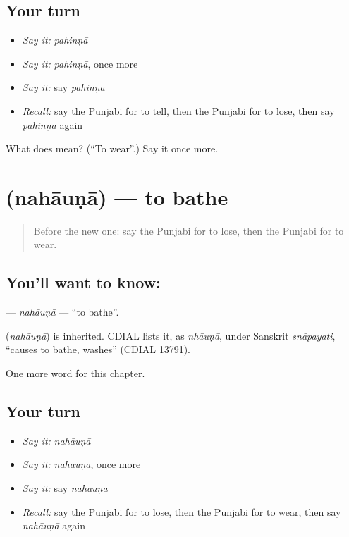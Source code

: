 \subsection*{Your turn}
\begin{itemize}
\raggedright
  \item \emph{Say it:} \emph{pahinṇā}
  \item \emph{Say it:} \emph{pahinṇā}, once more
  \item \emph{Say it:} say \emph{pahinṇā}
  \item \emph{Recall:} say the Punjabi for to tell, then the Punjabi for to lose, then say \emph{pahinṇā} again
\end{itemize}

\begin{tcolorbox}[breakable,colback=teal!4,colframe=teal!35!black,title={Before you move on}]
What does  mean? (\textquotedblleft{}To wear\textquotedblright{}.) Say it once more.
\end{tcolorbox}
\section[\texorpdfstring{\pa{ਨਹਾਉਣਾ} (nahāuṇā)}{ਨਹਾਉਣਾ (nahāuṇā)}]{ (nahāuṇā) — to bathe}

\label{lesson:PA-C62-nahauna}



\begin{quote}
Before the new one: say the Punjabi for to lose, then the Punjabi for to wear.
\end{quote}

\subsection*{You'll want to know: }
\textbf{} — \emph{nahāuṇā} — \textquotedblleft{}to bathe\textquotedblright{}.

\begin{cousinweb}
\textbf{} (\emph{nahāuṇā}) is inherited. CDIAL lists it, as \emph{nhāuṇā}, under Sanskrit \emph{snāpayati}, \textquotedblleft{}causes to bathe, washes\textquotedblright{} (CDIAL 13791).
\end{cousinweb}

\begin{grammarlens}[title={What you've built}]
One more word for this chapter.
\end{grammarlens}

\subsection*{Your turn}
\begin{itemize}
\raggedright
  \item \emph{Say it:} \emph{nahāuṇā}
  \item \emph{Say it:} \emph{nahāuṇā}, once more
  \item \emph{Say it:} say \emph{nahāuṇā}
  \item \emph{Recall:} say the Punjabi for to lose, then the Punjabi for to wear, then say \emph{nahāuṇā} again
\end{itemize}

